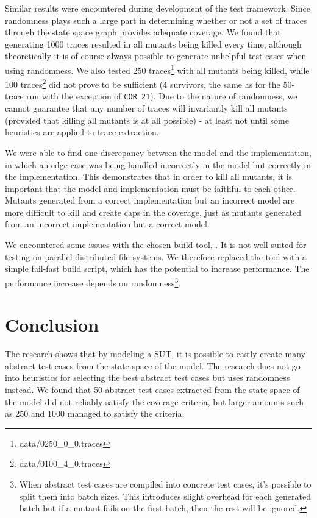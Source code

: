 \documentclass{article}
\begin{document}
		Similar results were encountered during development of the test framework. Since randomness plays such a large part in determining whether or not a set of traces through the state space graph provides adequate coverage. We found that generating 1000 traces resulted in all mutants being killed every time, although theoretically it is of course always possible to generate unhelpful test cases when using randomness. We also tested 250 traces\footnote{data/0250\_0\_0.traces} with all mutants being killed, while 100 traces\footnote{data/0100\_4\_0.traces} did not prove to be sufficient (4 survivors, the same as for the 50-trace run with the exception of \texttt{COR\_21}). Due to the nature of randomness, we cannot guarantee that any number of traces will invariantly kill all mutants (provided that killing all mutants is at all possible) \-- at least not until some heuristics are applied to trace extraction.

		We were able to find one discrepancy between the model and the implementation, in which an edge case was being handled incorrectly in the model but correctly in the implementation. This demonstrates that in order to kill all mutants, it is important that the model and implementation must be faithful to each other. Mutants generated from a correct implementation but an incorrect model are more difficult to kill and create caps in the coverage, just as mutants generated from an incorrect implementation but a correct model.

		We encountered some issues with the chosen build tool, \citeauthor{sbt}. It is not well suited for testing on parallel distributed file systems. We therefore replaced the tool with a simple fail-fast build script, which has the potential to increase performance. The performance increase depends on randomness\footnote{When abstract test cases are compiled into concrete test cases, it's possible to split them into batch sizes. This introduces slight overhead for each generated batch but if a mutant fails on the first batch, then the rest will be ignored.}.


	\section{Conclusion}
		The research shows that by modeling a SUT, it is possible to easily create many abstract test cases from the state space of the model. The research does not go into heuristics for selecting the best abstract test cases but uses randomness instead. We found that 50 abstract test cases extracted from the state space of the model did not reliably satisfy the coverage criteria, but larger amounts such as 250 and 1000 managed to satisfy the criteria.
\end{document}
